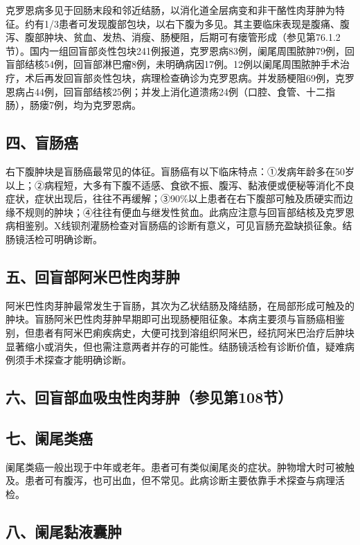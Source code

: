 克罗恩病多见于回肠末段和邻近结肠，以消化道全层病变和非干酪性肉芽肿为特征。约有1/3患者可发现腹部包块，以右下腹为多见。其主要临床表现是腹痛、腹泻、腹部肿块、贫血、发热、消瘦、肠梗阻，后期可有瘘管形成（参见第76.1.2节）。国内一组回盲部炎性包块241例报道，克罗恩病83例，阑尾周围脓肿79例，回盲部结核54例，回盲部淋巴瘤8例，未明确病因17例。12例以阑尾周围脓肿手术治疗，术后再发回盲部炎性包块，病理检查确诊为克罗恩病。并发肠梗阻69例，克罗恩病占44例，回盲部结核25例；并发上消化道溃疡24例（口腔、食管、十二指肠），肠瘘7例，均为克罗恩病。

\subsection{四、盲肠癌}

右下腹肿块是盲肠癌最常见的体征。盲肠癌有以下临床特点：①发病年龄多在50岁以上；②病程短，大多有下腹不适感、食欲不振、腹泻、黏液便或便秘等消化不良症状，症状出现后，往往不再缓解；③90\%以上患者在右下腹部可触及质硬实而边缘不规则的肿块；④往往有便血与继发性贫血。此病应注意与回盲部结核及克罗恩病相鉴别。X线钡剂灌肠检查对盲肠癌的诊断有意义，可见盲肠充盈缺损征象。结肠镜活检可明确诊断。

\subsection{五、回盲部阿米巴性肉芽肿}

阿米巴性肉芽肿最常发生于盲肠，其次为乙状结肠及降结肠，在局部形成可触及的肿块。盲肠阿米巴性肉芽肿早期即可出现肠梗阻征象。本病主要须与盲肠癌相鉴别，但患者有阿米巴痢疾病史，大便可找到溶组织阿米巴，经抗阿米巴治疗后肿块显著缩小或消失，但也需注意两者并存的可能性。结肠镜活检有诊断价值，疑难病例须手术探查才能明确诊断。

\subsection{六、回盲部血吸虫性肉芽肿（参见第108节）}

\subsection{七、阑尾类癌}

阑尾类癌一般出现于中年或老年。患者可有类似阑尾炎的症状。肿物增大时可被触及。患者可有腹泻，也可出血，但不常见。此病诊断主要依靠手术探查与病理活检。

\subsection{八、阑尾黏液囊肿}

